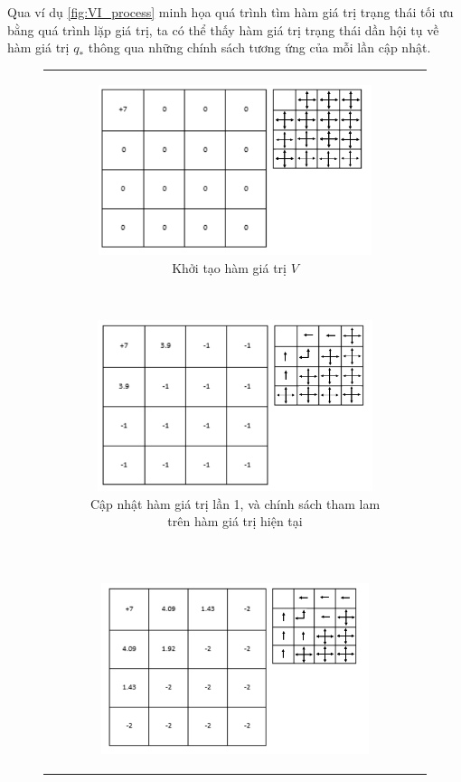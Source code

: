 Qua ví dụ \ref{fig:VI_process} minh họa quá trình tìm hàm giá trị trạng thái tối ưu bằng quá trình lặp giá trị, ta có thể thấy hàm giá trị trạng thái dần hội tụ về hàm giá trị $q_*$ thông qua những chính sách tương ứng của mỗi lần cập nhật.
\begin{figure}[t!]
	\centering
	\begin{tabular}{c}
		\begin{subfigure}[t]{0.5\textwidth}
			\centering
			\includegraphics[height=50mm]{1}
			\caption{Khởi tạo hàm giá trị $V$}
		\end{subfigure}%
		~ 
		\begin{subfigure}[t]{0.5\textwidth}
			\centering
			\includegraphics[height=50mm]{2}
			\caption{Cập nhật hàm giá trị lần 1, và chính sách tham lam trên hàm giá trị hiện tại}
		\end{subfigure} \\~\\
		\begin{subfigure}[t]{0.5\textwidth}
			\centering
			\includegraphics[height=50mm]{3}

\end{subfigure}
\end{tabular}
\end{figure}
